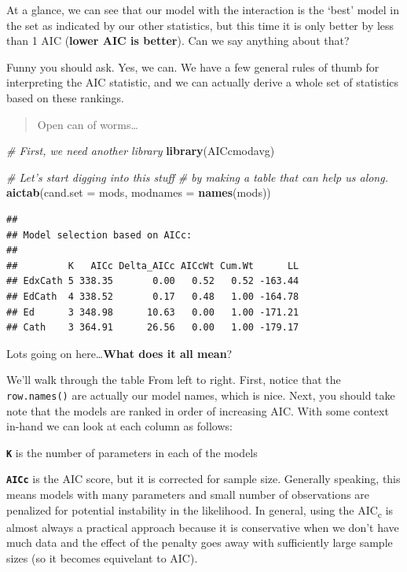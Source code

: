 \documentclass[
]{book}
\newenvironment{Shaded}{\begin{snugshade}}{\end{snugshade}}
\newcommand{\CommentTok}[1]{\textcolor[rgb]{0.56,0.35,0.01}{\textit{#1}}}
\newcommand{\DataTypeTok}[1]{\textcolor[rgb]{0.13,0.29,0.53}{#1}}
\newcommand{\KeywordTok}[1]{\textcolor[rgb]{0.13,0.29,0.53}{\textbf{#1}}}
\newcommand{\NormalTok}[1]{#1}
\begin{document}
At a glance, we can see that our model with the interaction is the `best' model in the set as indicated by our other statistics, but this time it is only better by less than 1 AIC (\textbf{lower AIC is better}). Can we say anything about that?

Funny you should ask. Yes, we can. We have a few general rules of thumb for interpreting the AIC statistic, and we can actually derive a whole set of statistics based on these rankings.

\begin{quote}
Open can of worms\ldots{}
\end{quote}

\begin{Shaded}
\begin{Highlighting}[]
\CommentTok{# First, we need another library}
\KeywordTok{library}\NormalTok{(AICcmodavg)}

\CommentTok{# Let's start digging into this stuff}
\CommentTok{# by making a table that can help us along.}
\KeywordTok{aictab}\NormalTok{(}\DataTypeTok{cand.set =}\NormalTok{ mods, }\DataTypeTok{modnames =} \KeywordTok{names}\NormalTok{(mods))}
\end{Highlighting}
\end{Shaded}

\begin{verbatim}
## 
## Model selection based on AICc:
## 
##         K   AICc Delta_AICc AICcWt Cum.Wt      LL
## EdxCath 5 338.35       0.00   0.52   0.52 -163.44
## EdCath  4 338.52       0.17   0.48   1.00 -164.78
## Ed      3 348.98      10.63   0.00   1.00 -171.21
## Cath    3 364.91      26.56   0.00   1.00 -179.17
\end{verbatim}

Lots going on here\ldots{}\textbf{What does it all mean}?

We'll walk through the table From left to right. First, notice that the \texttt{row.names()} are actually our model names, which is nice. Next, you should take note that the models are ranked in order of increasing AIC. With some context in-hand we can look at each column as follows:

\textbf{\texttt{K}} is the number of parameters in each of the models

\textbf{\texttt{AICc}} is the AIC score, but it is corrected for sample size. Generally speaking, this means models with many parameters and small number of observations are penalized for potential instability in the likelihood. In general, using the AIC\textsubscript{c} is almost always a practical approach because it is conservative when we don't have much data and the effect of the penalty goes away with sufficiently large sample sizes (so it becomes equivelant to AIC).
\end{document}
